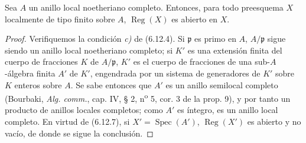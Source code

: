 \begin{corollary}[6.12.8]
\label{IV.2.s6.12.8-fr}
Sea $A$ un anillo local noetheriano completo. Entonces, para todo preesquema
$X$ localmente de tipo finito sobre $A$, $\operatorname{Reg}(X)$ es abierto
en $X$.
\end{corollary}

\begin{proof}
Verifiquemos la condición \emph{c)} de (6.12.4). Si $\mathfrak p$ es primo en
$A$, $A/\mathfrak p$ sigue siendo un anillo local noetheriano completo;
si $K'$ es una extensión finita del cuerpo de fracciones $K$ de
$A/\mathfrak p$, $K'$ es el cuerpo de fracciones de una sub-$A$-álgebra
finita $A'$ de $K'$, engendrada por un sistema de generadores de $K'$ sobre
$K$ enteros sobre $A$. Se sabe entonces que $A'$ es un anillo semilocal
completo (Bourbaki, \emph{Alg. comm.}, cap. IV, § 2, n\textsuperscript{o} 5, cor. 3 de la
prop. 9), y por tanto un producto de anillos locales completos; como
$A'$ es íntegro, es un anillo local completo. En virtud de (6.12.7), si
$X'=\operatorname{Spec}(A')$, $\operatorname{Reg}(X')$ es abierto y no vacío,
de donde se sigue la conclusión.
\end{proof}
